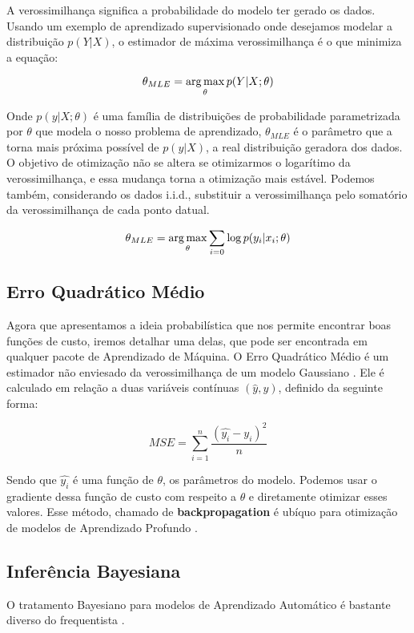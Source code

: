 A verossimilhança significa a probabilidade do modelo
ter gerado os dados. Usando um exemplo de aprendizado supervisionado onde
desejamos modelar a distribuição $p(Y|X)$, o estimador de máxima verossimilhança
é o que minimiza a equação:

\[
  \theta_{MLE} = \operatorname*{arg\,max}_{\theta} p( Y | X ; \theta)
\]

Onde $p(y | X ; \theta)$ é uma família de distribuições de probabilidade
parametrizada por $\theta$ que modela o nosso problema de aprendizado, $\theta_{MLE}$ é o parâmetro que a torna mais
próxima possível de $p(y | X)$, a real distribuição geradora dos dados. O
objetivo de otimização não se altera se otimizarmos o logarítimo da
verossimilhança, e essa mudança torna a otimização mais estável. Podemos também, considerando os dados i.i.d., substituir a verossimilhança pelo somatório da verossimilhança de cada ponto datual.

\begin{equation}
        \label{eq:objver}
  \theta_{MLE} = \operatorname*{arg\,max}_{\theta}\sum_{i=0}\log p( y_i | x_i ; \theta)
\end{equation}


\subsection{Erro Quadrático Médio}
\label{sec:MSE}


Agora que apresentamos a ideia probabilística que nos permite encontrar boas funções de custo, iremos detalhar uma delas, que pode ser encontrada em qualquer pacote de Aprendizado de Máquina. O Erro Quadrático Médio é um estimador não enviesado da verossimilhança de um
modelo Gaussiano \citep{dlbook}. Ele é calculado em relação a duas variáveis contínuas
$(\hat{y},y)$, definido da seguinte forma:

\[MSE = \sum^n_{i=1}\frac{(\hat{y_i} - y_i)^2}{n}\]


Sendo que $\hat{y_i}$ é uma função de $\theta$, os parâmetros do modelo. Podemos usar o gradiente dessa função de custo com respeito a $\theta$ e diretamente otimizar esses valores. Esse método, chamado de \textbf{backpropagation} é ubíquo para otimização de modelos de Aprendizado Profundo \citep{dlbook}.



\subsection{Inferência Bayesiana} 
\label{sec:bayesinf}
O tratamento Bayesiano para modelos de Aprendizado Automático é bastante diverso do frequentista \citep{dlbook}.

